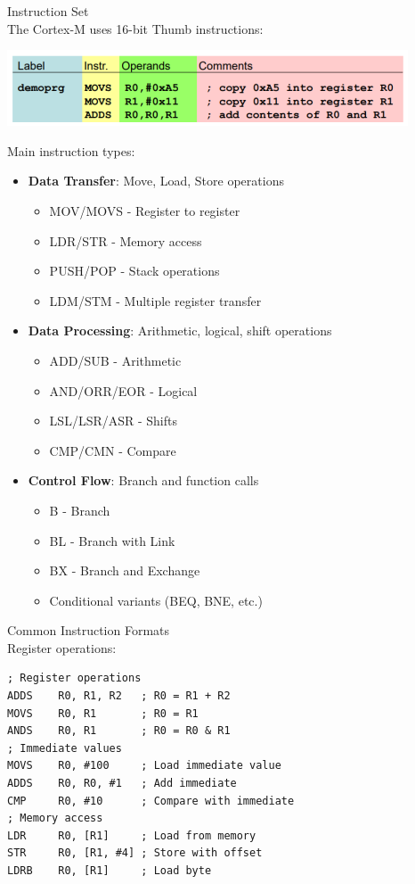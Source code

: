 \begin{definition}{Instruction Set}\\
The Cortex-M uses 16-bit Thumb instructions:

\includegraphics[width=\linewidth]{images/instruction_set.png}

Main instruction types:
\begin{itemize}
  \item \textbf{Data Transfer}: Move, Load, Store operations
    \begin{itemize}
      \item MOV/MOVS - Register to register
      \item LDR/STR - Memory access
      \item PUSH/POP - Stack operations
      \item LDM/STM - Multiple register transfer
    \end{itemize}
  \item \textbf{Data Processing}: Arithmetic, logical, shift operations
    \begin{itemize}
      \item ADD/SUB - Arithmetic
      \item AND/ORR/EOR - Logical
      \item LSL/LSR/ASR - Shifts
      \item CMP/CMN - Compare
    \end{itemize}
  \item \textbf{Control Flow}: Branch and function calls
    \begin{itemize}
      \item B - Branch
      \item BL - Branch with Link
      \item BX - Branch and Exchange
      \item Conditional variants (BEQ, BNE, etc.)
    \end{itemize}
\end{itemize}
\end{definition}



\begin{example2}{Common Instruction Formats}\\
Register operations:
\begin{lstlisting}[language=armasm, style=basesmol]
; Register operations
ADDS    R0, R1, R2   ; R0 = R1 + R2
MOVS    R0, R1       ; R0 = R1
ANDS    R0, R1       ; R0 = R0 & R1
; Immediate values
MOVS    R0, #100     ; Load immediate value
ADDS    R0, R0, #1   ; Add immediate
CMP     R0, #10      ; Compare with immediate
; Memory access
LDR     R0, [R1]     ; Load from memory
STR     R0, [R1, #4] ; Store with offset
LDRB    R0, [R1]     ; Load byte
\end{lstlisting}
\end{example2}

